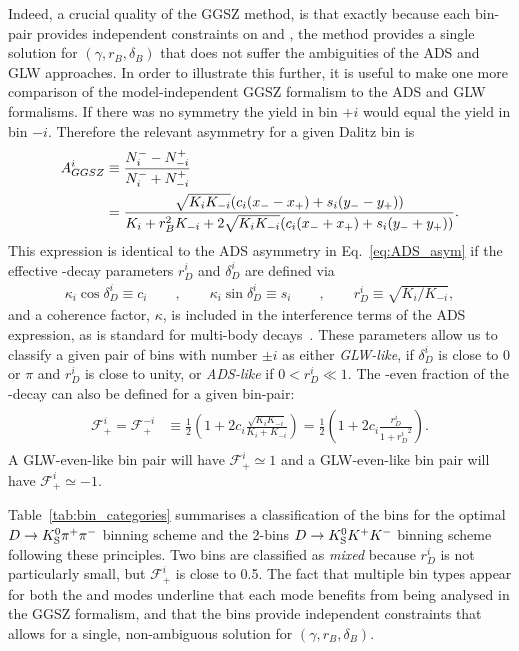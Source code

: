 Indeed, a crucial quality of the GGSZ method, is that exactly because each bin-pair provides independent constraints on \xpm and \ypm, the method provides a single solution for $(\gamma, r_B, \delta_B)$ that does not suffer the ambiguities of the ADS and GLW approaches. In order to illustrate this further, it is useful to make one more comparison of the model-independent GGSZ formalism to the ADS and GLW formalisms. If there was no \CP symmetry the \Bp yield in bin $+i$ would equal the \Bm yield in bin $-i$. Therefore the relevant \CP asymmetry for a given Dalitz bin is
\begin{align}
\begin{split}
        A_{GGSZ}^i &\equiv \frac{N^-_i - N^+_{-i}}{N^-_i + N^+_{-i}} \\
    &= \frac{\sqrt{K_i K_{-i}}(c_i(x_--x_+)+s_i(y_--y_+))}{K_i+r_B^2K_{-i} + 2 \sqrt{K_i K_{-i}}(c_i(x_-+x_+)+s_i(y_-+y_+))}.
\end{split}
\end{align}
This expression is identical to the ADS asymmetry in Eq.~\eqref{eq:ADS_asym} if the effective \D-decay parameters $r_D^i$ and $\delta_D^i$ are defined via
\begin{align}
    \kappa_i\cos\delta_D^i \equiv c_i \qquad, \qquad \kappa_i\sin \delta_D^i \equiv s_i \qquad, \qquad r_D^i \equiv \sqrt{K_i/K_{-i}},
\end{align}
and a coherence factor, $\kappa$, is included in the interference terms of the ADS expression, as is standard for multi-body \D decays~\cite{}. These parameters allow us to classify a given pair of bins with number $\pm i$ as either \emph{GLW-like}, if $ \delta_D^i$ is close to $0$ or $\pi$ and $r_D^i$  is close to unity, or \emph{ADS-like} if $0<r_D^i \ll 1$. The \CP-even fraction of the \D-decay can also be defined for a given bin-pair:
\begin{align}
\begin{split}
    \mathcal F_{+}^i = \mathcal F_+^{-i} &\equiv \frac{1}{2}\left(1 + 2c_i \frac{\sqrt{K_i K_{-i}}}{K_i + K_{-i}}\right) = \frac{1}{2}\left(1 + 2c_i \frac{r_D^i}{1+{r_D^i}^2}\right).
\end{split}
\end{align}
A GLW-even-like bin pair will have $\mathcal F_{+}^i\simeq 1$ and a GLW-even-like bin pair will have $\mathcal F_{+}^i\simeq -1$.

Table~\ref{tab:bin_categories} summarises a classification of the bins for the optimal $D\rightarrow{\ensuremath{{K}^0_{\mathrm{S}}}}{\ensuremath{{\pi}^+}}{\ensuremath{{\pi}^-}}$ binning scheme and the 2-bins ${{D}\rightarrow{\ensuremath{{K}^0_{\mathrm{S}}}}{\ensuremath{{K}^+}}{\ensuremath{{K}^-}}}$ binning scheme following these principles. Two bins are classified as \emph{mixed} because $r_D^i$ is not particularly small, but $\mathcal F_+^i$ is close to 0.5. The fact that multiple bin types appear for both the \DtoKspipi and \DtoKsKK modes underline that each mode benefits from being analysed in the GGSZ formalism, and that the bins provide independent constraints that allows for a single, non-ambiguous solution for $(\gamma, r_B, \delta_B)$. 

